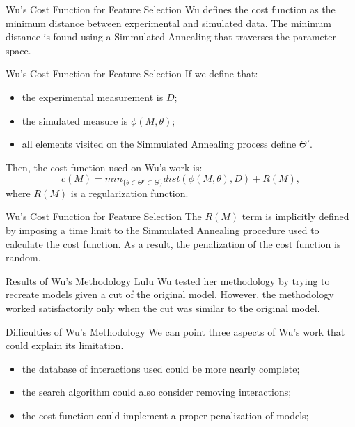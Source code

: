 \documentclass{beamer}
\begin{document}
\begin{frame}{Wu's Cost Function for Feature Selection}
Wu defines the cost function as the minimum distance between 
experimental and simulated data. 
\pause
The minimum distance is found using a Simmulated Annealing 
that traverses the parameter space.
\end{frame}


\begin{frame}{Wu's Cost Function for Feature Selection}
If we define that:\pause
\begin{itemize}
    \item{the experimental measurement is $D$;} \pause
    \item{the simulated measure is $\phi (M, \theta)$;} \pause
    \item{all elements visited on the Simmulated Annealing process 
        define $\Theta'$.}
\end{itemize}
\pause
Then, the cost function used on Wu's work is:
\begin{equation*}
    c (M) = min_{\{\theta \in \Theta' \subset \Theta\}}  
        dist (\phi(M, \theta), D) + R (M),
\end{equation*}
\pause
where $R (M)$ is a regularization function.
\end{frame}


\begin{frame}{Wu's Cost Function for Feature Selection}
The $R (M)$ term is implicitly defined by imposing a time limit to the 
Simmulated Annealing procedure used to calculate the cost function. 
\pause As a result, the penalization of the cost function is random.
\end{frame}


\begin{frame}{Results of Wu's Methodology}
Lulu Wu tested her methodology by trying to recreate models given a cut
of the original model. \pause However, the methodology worked 
satisfactorily only when the cut was similar to the original model.
\end{frame}


\begin{frame}{Difficulties of Wu's Methodology}
We can point three aspects of Wu's work that could explain its 
limitation.
\begin{itemize}
\pause
\item{the database of interactions used could be more nearly complete;} 
\pause
\item{the search algorithm could also consider removing interactions;}
\pause
\item{the cost function could implement a proper penalization of 
models;}
\end{itemize}
\end{frame}
\end{document}
